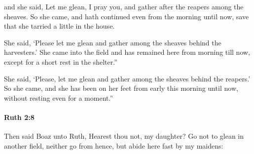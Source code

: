 			\begin{versebox}
					\item[BHS] 
					\item[LXX] 
					\item[ASV] and she said, Let me glean, I pray you, and gather after the reapers among the sheaves. So she came, and hath continued even from the morning until now, save that she tarried a little in the house.
					\item[NIV] She said, ‘Please let me glean and gather among the sheaves behind the harvesters.’ She came into the field and has remained here from morning till now, except for a short rest in the shelter.”
					\item[NRSV] She said, ‘Please, let me glean and gather among the sheaves behind the reapers.’ So she came, and she has been on her feet from early this morning until now, without resting even for a moment.”
			\end{versebox}

		\paragraph{Ruth 2:8} %
			\label{RUTH-2-8}

			Then said Boaz unto Ruth, Hearest thou not, my daughter? Go not to glean in another field, neither go from hence, but abide here fast by my maidens:

